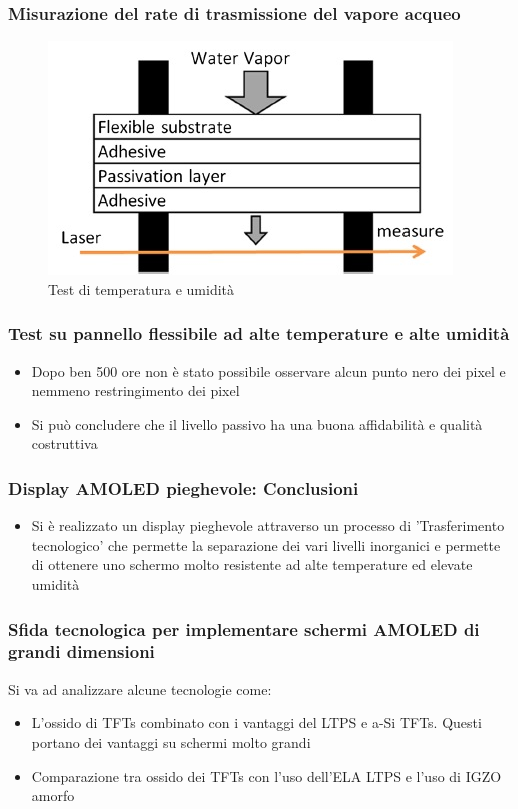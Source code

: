 \documentclass[12pt]{beamer}
\begin{document}
	\begin{frame}
		\frametitle{Misurazione del rate di trasmissione del vapore acqueo}
		\begin{figure}
			\centering
			\includegraphics[width=1\linewidth]{FISICA/test_temp}
			\caption{Test di temperatura e umidità}
			\label{fig:testtemp}
		\end{figure}
	\end{frame}
	\begin{frame}
		\frametitle{Test su pannello flessibile ad alte temperature e alte umidità}
		\begin{itemize}
			\item Dopo ben 500 ore non è stato possibile osservare alcun punto nero dei pixel e nemmeno restringimento dei pixel
			\pause
			\item Si può concludere che il livello passivo ha una buona affidabilità e qualità costruttiva
		\end{itemize}
	\end{frame}
	\begin{frame}
		\frametitle{Display AMOLED pieghevole: Conclusioni}
		\begin{itemize}
			\item Si è realizzato un display pieghevole attraverso un processo di 'Trasferimento tecnologico' che permette la separazione dei vari livelli inorganici e permette di ottenere uno schermo molto resistente ad alte temperature ed elevate umidità
		\end{itemize}
	\end{frame}
	\begin{frame}
		\frametitle{Sfida tecnologica per implementare schermi AMOLED di grandi dimensioni}
		Si va ad analizzare alcune tecnologie come:
		\begin{itemize}
			\item L’ossido di TFTs combinato con i vantaggi
			del LTPS e a-Si TFTs. Questi portano dei vantaggi su schermi molto grandi
			\pause
			\item Comparazione tra ossido dei TFTs con l'uso dell'ELA LTPS e l'uso di IGZO amorfo
		\end{itemize}
	\end{frame}
\end{document}
